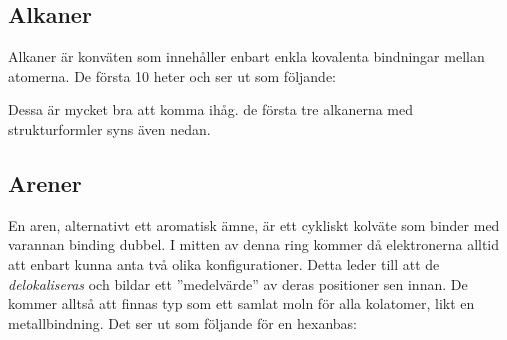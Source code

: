 \subsection{Alkaner}
Alkaner är konväten som innehåller enbart enkla kovalenta bindningar mellan atomerna. De första 10 heter och ser ut som följande:
\begin{center}
\end{center}
Dessa är mycket bra att komma ihåg. de första tre alkanerna med strukturformler syns även nedan.

\subsection{Arener}
En aren, alternativt ett aromatisk ämne, är ett cykliskt kolväte som binder med varannan binding dubbel. I mitten av denna ring kommer då elektronerna alltid att enbart kunna anta två olika konfigurationer. Detta leder till att de \emph{delokaliseras} och bildar ett ''medelvärde'' av deras positioner sen innan. De kommer alltså att finnas typ som ett samlat moln för alla kolatomer, likt en metallbindning. Det ser ut som följande för en hexanbas:
\begin{center}
\end{center}

